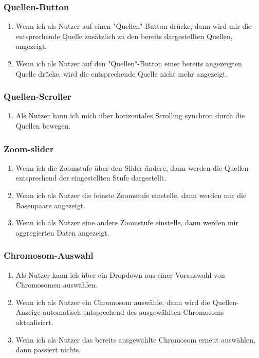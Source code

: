 \subsubsection{Quellen-Button}
\begin{enumerate}
	\item Wenn ich als Nutzer auf einen "Quellen"-Button drücke, dann wird mir die entsprechende Quelle zusätzlich zu den bereits dargestellten Quellen, angezeigt.
	\item Wenn ich als Nutzer auf den "Quellen"-Button einer bereits angezeigten Quelle drücke, wird die entsprechende Quelle nicht mehr angezeigt.
\end{enumerate}

\subsubsection{Quellen-Scroller}
\begin{enumerate}
	\item Als Nutzer kann ich mich über horizontales Scrolling synchron durch die Quellen bewegen.
\end{enumerate}

\subsubsection{Zoom-slider}
\begin{enumerate}
	\item Wenn ich die Zoomstufe über den Slider ändere, dann werden die Quellen entsprechend der eingestellten Stufe dargestellt.
	\item Wenn ich als Nutzer die feinste Zoomstufe einstelle, dann werden mir die Basenpaare angezeigt.
	\item Wenn ich als Nutzer eine andere Zoomstufe einstelle, dann werden mir aggregierten Daten angezeigt.
\end{enumerate}

\subsubsection{Chromosom-Auswahl}
\begin{enumerate}
	\item Als Nutzer kann ich über ein Dropdown aus einer Vorauswahl von Chromosomen auswählen.
	\item Wenn ich als Nutzer ein Chromosom auswähle, dann wird die Quellen-Anzeige automatisch entsprechend des ausgewählten Chromosoms aktualisiert.
	\item Wenn ich als Nutzer das bereits ausgewählte Chromosom erneut auswählen, dann passiert nichts.
\end{enumerate}

